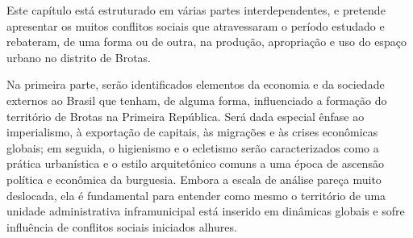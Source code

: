 
Este capítulo está estruturado em várias partes interdependentes, e pretende apresentar os muitos conflitos sociais que atravessaram o período estudado e rebateram, de uma forma ou de outra, na produção, apropriação e uso do espaço urbano no distrito de Brotas.

Na primeira parte, serão identificados elementos da economia e da sociedade externos ao Brasil que tenham, de alguma forma, influenciado a formação do território de Brotas na Primeira República. Será dada especial ênfase ao imperialismo, à exportação de capitais, às migrações e às crises econômicas globais; em seguida, o higienismo e o ecletismo serão caracterizados como a prática urbanística e o estilo arquitetônico comuns a uma época de ascensão política e econômica da burguesia. Embora a escala de análise pareça muito deslocada, ela é fundamental para entender como mesmo o território de uma unidade administrativa inframunicipal está inserido em dinâmicas globais e sofre influência de conflitos sociais iniciados alhures.

